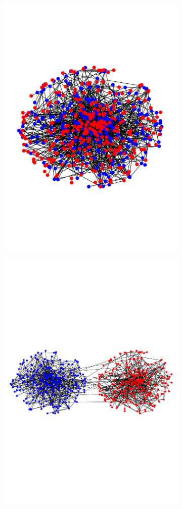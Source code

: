 \documentclass[english]{article}
\newcommand{\1}{\textbf{1}}
\begin{document}
\begin{figure}[h]
\centering
\begin{subfigure}{.5\textwidth}
  \centering
  \includegraphics[width=.5\linewidth]{benno2t.pdf}
\end{subfigure}%
\begin{subfigure}{.5\textwidth}
  \centering
  \includegraphics[width=.9\linewidth]{bennot.pdf}

\end{subfigure}
\end{figure}
\end{document}
